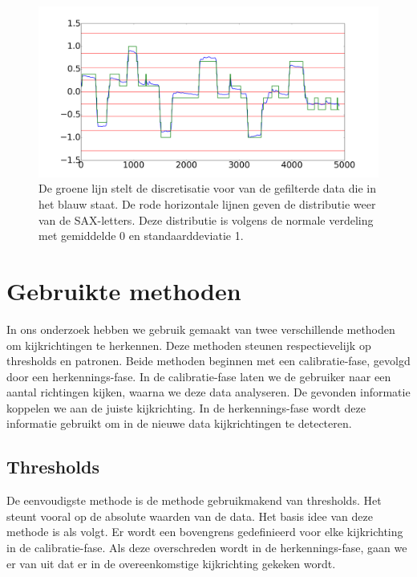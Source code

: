 \documentclass{article}
\begin{document}
\begin{figure}[h]
\centering
\includegraphics[width=\linewidth]{images/sax_normaal_verdeling}
\caption{De groene lijn stelt de discretisatie voor van de gefilterde data die in het blauw staat. De rode horizontale lijnen geven de distributie weer van de SAX-letters. Deze distributie is volgens de normale verdeling met gemiddelde 0 en standaarddeviatie 1.}
\label{fig:discretization}
\end{figure}

\section{Gebruikte methoden}

In ons onderzoek hebben we gebruik gemaakt van twee verschillende methoden om kijkrichtingen te herkennen. Deze methoden steunen respectievelijk op thresholds en patronen. Beide methoden beginnen met een calibratie-fase, gevolgd door een herkennings-fase. In de calibratie-fase laten we de gebruiker naar een aantal richtingen kijken, waarna we deze data analyseren. De gevonden informatie koppelen we aan de juiste kijkrichting. In de herkennings-fase wordt deze informatie gebruikt om in de nieuwe data kijkrichtingen te detecteren.

\subsection{Thresholds}

De eenvoudigste methode is de methode gebruikmakend van thresholds. Het steunt vooral op de absolute waarden van de data. Het basis idee van deze methode is als volgt. Er wordt een bovengrens gedefinieerd voor elke kijkrichting in de calibratie-fase. Als deze overschreden wordt in de herkennings-fase, gaan we er van uit dat er in de overeenkomstige kijkrichting gekeken wordt.
\end{document}
